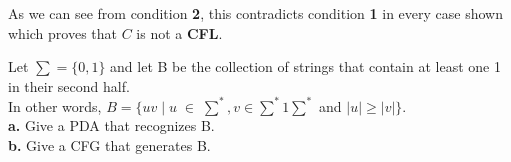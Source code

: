 \documentclass[12pt]{article}
\begin{document}
As we can see from condition \textbf{2}, this contradicts condition \textbf{1} 
in every case shown which proves that $C$ is not a \textbf{CFL}.

 Let $\sum = \{0, 1\}$ and let B be the collection of strings that contain at least one 1 in
their second half. \\
In other words, $B = \{uv \; | \; u \; \in \; \sum^*, v \in \sum^*1\sum^*$ and $|u| \geq |v|\} $. \\

\textbf{a.} Give a PDA that recognizes B. \\

\textbf{b.} Give a CFG that generates B. \\
\end{document}

